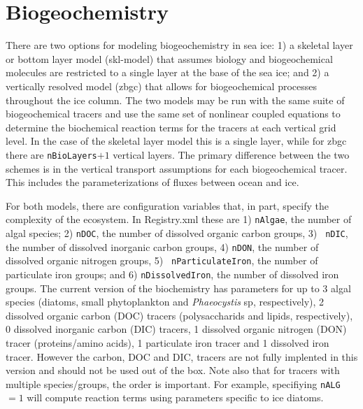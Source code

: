 \section{Biogeochemistry}
\label{sec:biogeochemistry}

%
\newcommand\bgcNO{\mbox{NO$_3$}}
\newcommand\bgcNH{\mbox{NH$_4$}}
\newcommand\bgcSi{\mbox{SiO$_3$}}
\newcommand\bgcN{\mbox{N}}
\newcommand\bgcDOC{\mbox{DOC}}
\newcommand\bgcDON{\mbox{DON}}
\newcommand\bgcfed{\mbox{fed}}
\newcommand\bgcfep{\mbox{fep}}
\newcommand\bgcchl{\ensuremath{\mbox{Chl}a}}
\newcommand\bgcDMS{\mbox{DMS}}
\newcommand\bgcDMSP{\mbox{DMSP}}
\newcommand\bgcDMSPp{\mbox{DMSPp}}
\newcommand\bgcDMSPd{\mbox{DMSPd}}
\newcommand\bgcPON{\mbox{PON}}
\newcommand\zaeroBC{\mbox{BC}}
\newcommand\zaerodust{\mbox{dust}}
\newcommand\bgcie{i.e.\ }


There are two options for modeling  biogeochemistry in  sea ice: 1) a
skeletal layer or bottom layer model (skl-model) that assumes
biology and biogeochemical molecules are restricted to a single layer at the base of the sea ice;
and 2) a vertically resolved model (zbgc) that allows for biogeochemical processes throughout the
ice column.  The two models may be run with the same suite of
biogeochemical tracers and use the same set of nonlinear coupled equations to determine the biochemical
reaction terms for the tracers at each vertical grid level.  In the
case of the skeletal layer model this is a single layer, while for
zbgc  there are {\tt nBioLayers}$+1$ vertical layers.  The primary difference between the
two schemes is in the vertical transport assumptions for each
biogeochemical tracer.  This includes the parameterizations
of fluxes between ocean and ice.

For both models, there are configuration variables that, in part, specify the
complexity of the ecosystem.  In Registry.xml these are 1) {\tt nAlgae}, the number of algal species; 2)
{\tt nDOC}, the number of dissolved organic carbon groups, 3)  {\tt
  nDIC}, the number of dissolved inorganic carbon groups, 4)
{\tt nDON}, the number of dissolved organic nitrogen groups, 5)  {\tt
  nParticulateIron}, the number of particulate iron groups; and 6) {\tt nDissolvedIron},
the number of dissolved iron groups.  The current version of the
 biochemistry has parameters for up to 3 algal
species (diatoms, small phytoplankton and {\it Phaeocystis} sp,
respectively), 2 dissolved organic carbon (DOC) tracers (polysaccharids and lipids,
respectively), 0 dissolved inorganic carbon (DIC) tracers, 1 dissolved
organic nitrogen (DON) tracer (proteins/amino acids),
1 particulate iron tracer and 1 dissolved iron tracer.  However the
carbon, DOC and DIC, tracers are not fully implented in this version and
should not be used out of the box. Note also that for
tracers with multiple species/groups, the
order is important.  For example, specifiying {\tt nALG}$ = 1$ will
compute reaction terms using parameters specific to ice diatoms.

